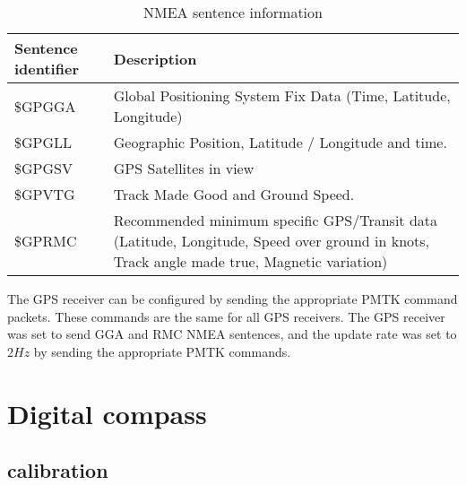 \begin{table}[!h]
    \centering
    \caption{NMEA sentence information}
    \label{table:NMEA}
    \begin{tabular}{ | m{10em} | m{25em} | }
        
        \hline
        \textbf{Sentence identifier} & \textbf{Description} \\
        \hline
        \$GPGGA & Global Positioning System Fix Data (Time, Latitude, Longitude) \\
        \hline
        \$GPGLL & Geographic Position, Latitude / Longitude and time. \\
        \hline
        \$GPGSV & GPS Satellites in view \\
        \hline
        \$GPVTG & Track Made Good and Ground Speed. \\
        \hline
        \$GPRMC & Recommended minimum specific GPS/Transit data (Latitude, Longitude, Speed over ground in knots, Track angle made true, Magnetic variation) \\
        \hline
    \end{tabular}
\end{table}

The GPS receiver can be configured by sending the appropriate PMTK command packets\cite{pmtk}. These commands are the same for all GPS receivers. The GPS receiver was
set to send GGA and RMC NMEA sentences, and the update rate was set to $2Hz$ by sending the appropriate PMTK commands.

\section{Digital compass}

\subsection{calibration}


